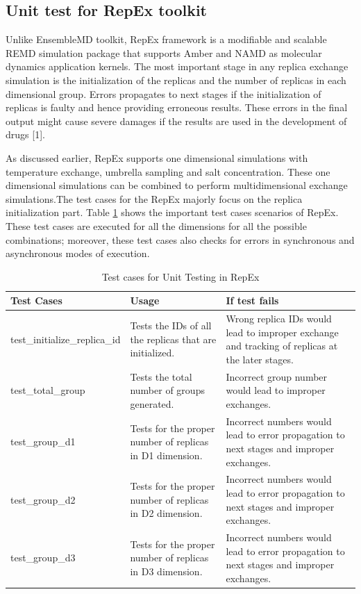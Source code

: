 \documentclass[10pt]{ruthesis}
\begin{document}
\subsection{Unit test for RepEx toolkit}
Unlike EnsembleMD toolkit, RepEx framework is a modifiable and scalable REMD simulation package that supports Amber and NAMD as molecular dynamics application kernels. The most important stage in any replica exchange simulation is the initialization of the replicas and the number of replicas in each dimensional group. Errors propagates to next stages if the initialization of replicas is faulty and hence providing erroneous results. These errors in the final output might cause severe damages if the results are used in the development of drugs [1].

As discussed earlier, RepEx supports one dimensional simulations with temperature exchange, umbrella sampling and salt concentration. These one dimensional simulations can be combined to perform multidimensional exchange simulations.The test cases for the RepEx majorly focus on the replica initialization part. Table \ref{repexapitable} shows the important test cases scenarios of RepEx. These test cases are executed for all the dimensions for all the possible combinations; moreover, these test cases also checks for errors in synchronous and asynchronous modes of execution.

\begin{table}
\begin{center}
\def\arraystretch{2}
\begin{tabular}{|p{4cm}|p{5cm}|p{6cm}|}
\hline
\rule{0pt}{15pt} \textbf{Test Cases} & \textbf{Usage} & \textbf{If test fails} \\[2ex]
\hline
test\_initialize\_replica\_id &
Tests the IDs of all the replicas that are initialized. &
Wrong replica IDs would lead to improper exchange and tracking of replicas at the later stages.
\\
\hline
test\_total\_group &
Tests the total number of groups generated. &
Incorrect group number would lead to improper exchanges.
\\
\hline
test\_group\_d1 &
Tests for the proper number of replicas in D1 dimension. &
Incorrect numbers would lead to error propagation to next stages and improper exchanges.
\\
\hline
test\_group\_d2 &
Tests for the proper number of replicas in D2 dimension. &
Incorrect numbers would lead to error propagation to next stages and improper exchanges.
\\
test\_group\_d3 &
Tests for the proper number of replicas in D3 dimension. &
Incorrect numbers would lead to error propagation to next stages and improper exchanges.
\\
\hline
\end{tabular}
\end{center}
\caption{Test cases for Unit Testing in RepEx}
\label{repexapitable}
\end{table}
\end{document}
